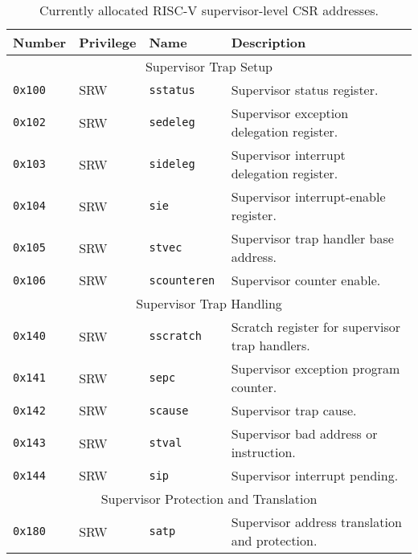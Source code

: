 \begin{table}[htb!]
\begin{center}
\begin{tabular}{|l|l|l|l|}
\hline
Number    & Privilege & Name & Description \\
\hline  
\multicolumn{4}{|c|}{Supervisor Trap Setup} \\
\hline
\tt 0x100 & SRW  &\tt sstatus    & Supervisor status register. \\
\tt 0x102 & SRW  &\tt sedeleg    & Supervisor exception delegation register. \\
\tt 0x103 & SRW  &\tt sideleg    & Supervisor interrupt delegation register. \\
\tt 0x104 & SRW  &\tt sie        & Supervisor interrupt-enable register. \\
\tt 0x105 & SRW  &\tt stvec      & Supervisor trap handler base address. \\
\tt 0x106 & SRW  &\tt scounteren & Supervisor counter enable. \\
\hline
\multicolumn{4}{|c|}{Supervisor Trap Handling} \\
\hline
\tt 0x140 & SRW  &\tt sscratch   & Scratch register for supervisor trap handlers. \\
\tt 0x141 & SRW  &\tt sepc       & Supervisor exception program counter. \\
\tt 0x142 & SRW  &\tt scause     & Supervisor trap cause. \\
\tt 0x143 & SRW  &\tt stval      & Supervisor bad address or instruction. \\
\tt 0x144 & SRW  &\tt sip        & Supervisor interrupt pending. \\
\hline
\multicolumn{4}{|c|}{Supervisor Protection and Translation} \\
\hline
\tt 0x180 & SRW  &\tt satp       & Supervisor address translation and protection. \\
\hline
\end{tabular}
\end{center}
\caption{Currently allocated RISC-V supervisor-level CSR addresses.}
\label{scsrnames}
\end{table}

